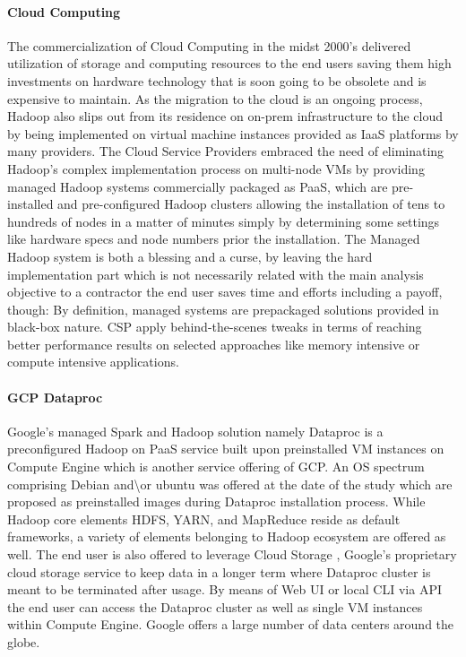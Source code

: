 \documentclass[review]{elsarticle}
\begin{document}
\paragraph{Cloud Computing}The commercialization of Cloud Computing in the midst 2000's \cite{noauthor_announcing_nodate} delivered utilization of storage and computing resources to the end users saving them high investments on hardware technology that is soon going to be obsolete and is expensive to maintain. As the migration to the cloud is an ongoing process, Hadoop also slips out from its residence on on-prem infrastructure to the cloud by being implemented on virtual machine instances provided as IaaS platforms by many providers. The Cloud Service Providers embraced the need of eliminating Hadoop's complex implementation process on multi-node VMs by providing managed Hadoop systems commercially packaged as PaaS, which are pre-installed and pre-configured Hadoop clusters allowing the installation of tens to hundreds of nodes in a matter of minutes simply by determining some settings like hardware specs and node numbers prior the installation. The Managed Hadoop system is both a blessing and a curse, by leaving the hard implementation part which is not necessarily related with the main analysis objective to a contractor the end user saves time and efforts including a payoff, though: By definition, managed systems are prepackaged solutions provided in black-box nature. CSP apply behind-the-scenes tweaks in terms of reaching better performance results on selected approaches like memory intensive or compute intensive applications.

\paragraph{GCP Dataproc \cite{noauthor_dataproc_nodate}} Google's managed Spark and Hadoop solution namely Dataproc is a preconfigured Hadoop on PaaS service built upon preinstalled VM instances on Compute Engine \cite{noauthor_compute_nodate} which is another service offering of GCP. An OS spectrum comprising Debian and\textbackslash or ubuntu was offered at the date of the study which are proposed as preinstalled images during Dataproc installation process. While Hadoop core elements HDFS, YARN, and MapReduce reside as default frameworks, a variety of elements belonging to Hadoop ecosystem are offered as well. The end user is also offered to leverage Cloud Storage \cite{noauthor_cloud_nodate}, Google's proprietary cloud storage service to keep data in a longer term where Dataproc cluster is meant to be terminated after usage. By means of Web UI or local CLI via API the end user can access the Dataproc cluster as well as single VM instances within Compute Engine. Google offers a large number of data centers around the globe.
\end{document}

